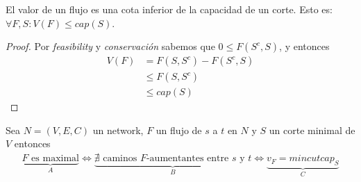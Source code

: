 \begin{corollary}
  El valor de un flujo es una cota inferior de la capacidad de un corte.
  Esto es: $\forall F, S \colon V(F) \le cap(S)$.
\end{corollary}

\begin{proof}
  Por \emph{feasibility} y \emph{conservación} sabemos que
  $0 \le F(S^c, S)$, y entonces
  \begin{align}
    V(F)
    &= F(S, S^c) - F(S^c, S)\\
	  &\le F(S, S^c)\\
    &\le cap(S)
  \end{align}
\end{proof}

\begin{theorem}
  Sea $N = (V,E,C)$ un network, $F$ un flujo de $s$ a $t$ en $N$ y $S$ un corte minimal de $V$ entonces
  \begin{align}
    \underbrace{F \text{ es maximal}}_{A} \iff 
    \underbrace{\nexists \text{ caminos } F\text{-aumentantes entre $s$ y $t$}}_{B} \iff
    \underbrace{v_F = mincutcap_S}_{C}
  \end{align}
\end{theorem}
